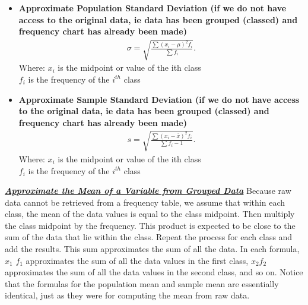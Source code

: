 \documentclass{report}
\begin{document}
\begin{itemize}
            \item \textbf{Approximate Population Standard Deviation (if we do not have access to the original data, ie data has been grouped (classed) and frequency chart has already been made)}
                \begin{align*}
                    \sigma = \sqrt{\frac{\sum(x_{i} - \mu)^{2}f_{i}}{\sum f_{i}}}
                .\end{align*}
                Where: \quad  $x_{i}$ is the midpoint or value of the ith class \\
                $f_{i}$ is the frequency of the $i^{th}$ class
            \item \textbf{Approximate Sample Standard Deviation (if we do not have access to the original data, ie data has been grouped (classed) and frequency chart has already been made)}
                \begin{align*}
                    s = \sqrt{\frac{\sum(x_{i}-\overline{x})^{2}f_{i}}{\sum f_{i} -1}}
                .\end{align*}
                Where: \quad  $x_{i}$ is the midpoint or value of the ith class \\
                $f_{i}$ is the frequency of the $i^{th}$ class
         \end{itemize}

         \pagebreak \bigbreak \noindent
         \textbf{\textit{\underline{Approximate the Mean of a Variable from Grouped Data}}}
         \bigbreak \noindent 
         Because raw data cannot be retrieved from a frequency table, we assume that within each class, the mean of the data values is equal to the class midpoint. Then multiply the class midpoint by the frequency. This product is expected to be close to the sum of the data that lie within the class. Repeat the process for each class and add the results. This sum approximates the sum of all the data.
         \bigbreak \noindent 
         In each formula, $x_{1}$ $f_{1} $  approximates the sum of all the data values in the first class, $x_{2}f_{2} $  approximates the sum of all the data values in the second class, and so on. Notice that the formulas for the population mean and sample mean are essentially identical, just as they were for computing the mean from raw data.
\end{document}
